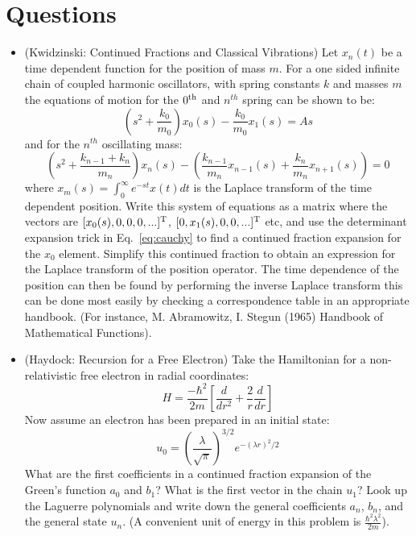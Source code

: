 \section{Questions}
\begin{itemize}
\item (Kwidzinski: Continued Fractions and Classical Vibrations) 
      Let $x_{n}(t)$ be a time dependent function for the position of mass $m$.
      For a one sided infinite chain of coupled harmonic oscillators, with 
      spring constants $k$ and masses $m$ the equations of motion for the $0^{\rm th}$ and
      $n^{th}$ spring can be shown to be:
      \begin{equation}
      (s^{2} + \frac{k_{0}}{m_{0}}) x_{0}(s) - \frac{k_{0}}{m_{0}}x_{1}(s) = As 
      \end{equation}
      and for the $n^{th}$ oscillating mass:
      \begin{equation}
      (s^{2}+\frac{k_{n-1}+k_{n}}{m_{n}})x_{n}(s)-(\frac{k_{n-1}}{m_{n}}x_{n-1}(s) + \frac{k_{n}}{m_{n}}x_{n+1}(s)) = 0
      \end{equation}
      where $x_{m}(s) = \int_{0}^{\infty}e^{-st}x(t)dt$ is the Laplace transform of the time dependent position.
      Write this system of equations as a matrix where the vectors 
      are $[x_{0}(s), 0, 0, 0,...]^{\rm T}$, $[0, x_{1}(s), 0, 0, ...]^{\rm T}$ etc,
      and use the determinant expansion trick in Eq.~\ref{eq:cauchy} to find a 
      continued fraction expansion for the $x_{0}$ element.
      Simplify this continued fraction to obtain an expression for the Laplace 
      transform of the position operator.
      The time dependence of the position can then be found by performing the inverse Laplace transform
      this can be done most easily by checking a correspondence table
      in an appropriate handbook. (For instance, M. Abramowitz, I. Stegun (1965) 
      Handbook of Mathematical Functions).

\item (Haydock: Recursion for a Free Electron) Take the Hamiltonian for a non-relativistic 
free electron in radial coordinates:
%
\begin{equation}
H = \frac{-\hbar^{2}}{2m}\left[\frac{d}{dr^{2}}+ \frac{2}{r}\frac{d}{dr}\right]
\end{equation}
%
Now assume an electron has been prepared in an initial state:
%
\begin{equation}
u_{0}=(\frac{\lambda}{\sqrt{\pi}})^{3/2} e^{-(\lambda r)^{2}/2}
\end{equation}
%
What are the first coefficients in a continued fraction expansion of the Green's
function $a_{0}$ and $b_{1}$? What is the first vector in the chain $u_{1}$?
Look up the Laguerre polynomials and write down the general 
coefficients $a_{n}$, $b_n$, and the general state $u_{n}$. 
(A convenient unit of energy in this problem is $\frac{\hbar^{2}\lambda^{2}}{2m}$).


\end{itemize}
